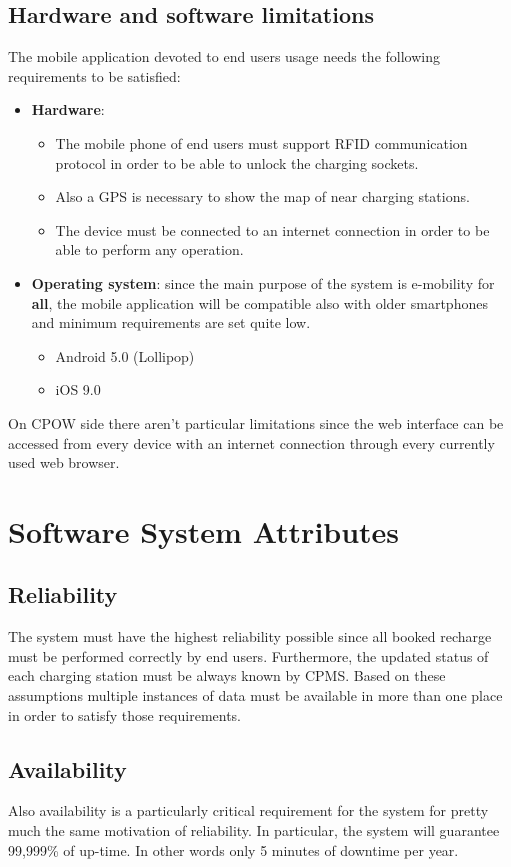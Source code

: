 \documentclass[a4paper]{report}
\begin{document}
\subsection{Hardware and software limitations}
The mobile application devoted to end users usage needs the following requirements to be satisfied:
\begin{itemize}
    \item \textbf{Hardware}:
        \begin{itemize}
            \item The mobile phone of end users must support RFID communication protocol in order to be able to unlock the charging sockets.
            \item Also a GPS is necessary to show the map of near charging stations.
            \item The device must be connected to an internet connection in order to be able to perform any operation.
        \end{itemize} 
    \item \textbf{Operating system}: since the main purpose of the system is e-mobility for \textbf{all}, the mobile application will be compatible also with older smartphones and minimum requirements are set quite low.
        \begin{itemize}
            \item Android 5.0 (Lollipop)
            \item iOS 9.0
        \end{itemize}
\end{itemize}
On CPOW side there aren't particular limitations since the web interface can be accessed from every device with an internet connection through every currently used web browser.

\section{Software System Attributes}
\subsection{Reliability}
The system must have the highest reliability possible since all booked recharge must be performed correctly by end users. Furthermore, the updated status of each charging station must be always known by CPMS. Based on these assumptions multiple instances of data must be available in more than one place in order to satisfy those requirements.

\subsection{Availability}
Also availability is a particularly critical requirement for the system for pretty much the same motivation of reliability. In particular, the system will guarantee 99,999\% of up-time. In other words only 5 minutes of downtime per year.
\end{document}
